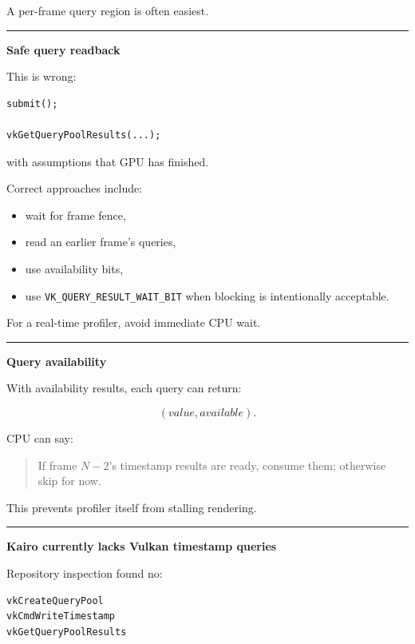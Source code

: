A per-frame query region is often easiest.

\begin{center}\rule{0.5\linewidth}{0.5pt}\end{center}

\textbf{Safe query readback}

This is wrong:

\begin{verbatim}
submit();

vkGetQueryPoolResults(...);
\end{verbatim}

with assumptions that GPU has finished.

Correct approaches include:

\begin{itemize}
\tightlist
\item
  wait for frame fence,
\item
  read an earlier frame's queries,
\item
  use availability bits,
\item
  use \texttt{VK\_QUERY\_RESULT\_WAIT\_BIT} when blocking is intentionally acceptable.
\end{itemize}

For a real-time profiler, avoid immediate CPU wait.

\begin{center}\rule{0.5\linewidth}{0.5pt}\end{center}

\textbf{Query availability}

With availability results, each query can return:

\[
(value,available).
\]

CPU can say:

\begin{quote}
If frame \(N-2\)'s timestamp results are ready, consume them; otherwise skip for now.
\end{quote}

This prevents profiler itself from stalling rendering.

\begin{center}\rule{0.5\linewidth}{0.5pt}\end{center}

\textbf{Kairo currently lacks Vulkan timestamp queries}

Repository inspection found no:

\begin{verbatim}
vkCreateQueryPool
vkCmdWriteTimestamp
vkGetQueryPoolResults
\end{verbatim}

